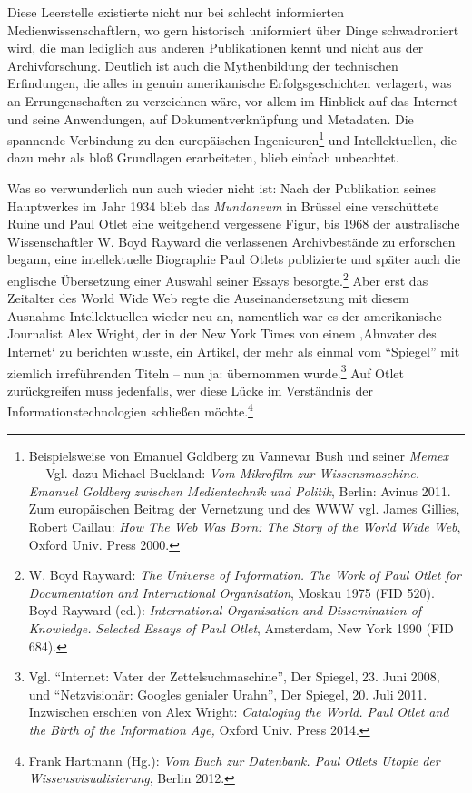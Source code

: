 Diese Leerstelle existierte nicht nur bei schlecht informierten
Medienwissenschaftlern, wo gern historisch uniformiert über Dinge
schwadroniert wird, die man lediglich aus anderen Publikationen kennt
und nicht aus der Archivforschung. Deutlich ist auch die Mythenbildung
der technischen Erfindungen, die alles in genuin amerikanische
Erfolgsgeschichten verlagert, was an Errungenschaften zu verzeichnen
wäre, vor allem im Hinblick auf das Internet und seine Anwendungen, auf
Dokumentverknüpfung und Metadaten. Die spannende Verbindung zu den
europäischen Ingenieuren\footnote{Beispielsweise von Emanuel Goldberg zu
  Vannevar Bush und seiner \emph{Memex} --- Vgl. dazu Michael Buckland:
  \emph{Vom Mikrofilm zur Wissensmaschine. Emanuel Goldberg zwischen
  Medientechnik und Politik}, Berlin: Avinus 2011. Zum europäischen
  Beitrag der Vernetzung und des WWW vgl. James Gillies, Robert Caillau:
  \emph{How The Web Was Born: The Story of the World Wide Web}, Oxford
  Univ. Press 2000.} und Intellektuellen, die dazu mehr als bloß
Grundlagen erarbeiteten, blieb einfach unbeachtet.

Was so verwunderlich nun auch wieder nicht ist: Nach der Publikation
seines Hauptwerkes im Jahr 1934 blieb das \emph{Mundaneum} in Brüssel
eine verschüttete Ruine und Paul Otlet eine weitgehend vergessene Figur,
bis 1968 der australische Wissenschaftler W. Boyd Rayward die
verlassenen Archivbestände zu erforschen begann, eine intellektuelle
Biographie Paul Otlets publizierte und später auch die englische
Übersetzung einer Auswahl seiner Essays besorgte.\footnote{W. Boyd
  Rayward: \emph{The Universe of Information. The Work of Paul Otlet for
  Documentation and International Organisation}, Moskau 1975 (FID 520).
  Boyd Rayward (ed.): \emph{International Organisation and Dissemination
  of Knowledge. Selected Essays of Paul Otlet}, Amsterdam, New York 1990
  (FID 684).} Aber erst das Zeitalter des World Wide Web regte die
Auseinandersetzung mit diesem Ausnahme-Intellektuellen wieder neu an,
namentlich war es der amerikanische Journalist Alex Wright, der in der
New York Times von einem ‚Ahnvater des Internet` zu berichten wusste,
ein Artikel, der mehr als einmal vom \enquote{Spiegel} mit ziemlich
irreführenden Titeln -- nun ja: übernommen wurde.\footnote{Vgl.
  \enquote{Internet: Vater der Zettelsuchmaschine}, Der Spiegel, 23.
  Juni 2008, und \enquote{Netzvisionär: Googles genialer Urahn}, Der
  Spiegel, 20. Juli 2011. Inzwischen erschien von Alex Wright:
  \emph{Cataloging the World. Paul Otlet and the Birth of the
  Information Age,} Oxford Univ. Press 2014.} Auf Otlet zurückgreifen
muss jedenfalls, wer diese Lücke im Verständnis der
Informationstechnologien schließen möchte.\footnote{Frank Hartmann
  (Hg.): \emph{Vom Buch zur Datenbank. Paul Otlets Utopie der
  Wissensvisualisierung}, Berlin 2012.}

